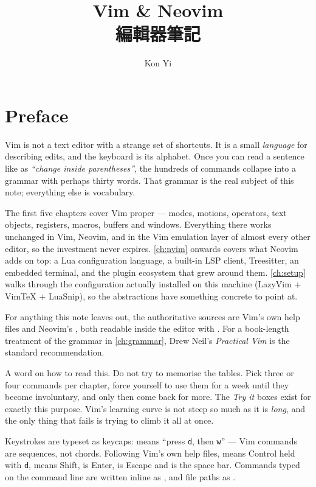 \documentclass[a4paper,oneside]{scrbook}
\author{Kon Yi}
\title{Vim \& Neovim \\ 編輯器筆記}
\begin{document}
\maketitle

\chapter*{Preface}

Vim is not a text editor with a strange set of shortcuts. It is a small
\emph{language} for describing edits, and the keyboard is its alphabet.
Once you can read a sentence like   \key{(} as \emph{``change
	inside parentheses''}, the hundreds of commands collapse into a grammar with
perhaps thirty words. That grammar is the real subject of this note; everything
else is vocabulary.

The first five chapters cover Vim proper --- modes, motions, operators, text
objects, registers, macros, buffers and windows. Everything there works
unchanged in Vim, Neovim, and in the Vim emulation layer of almost every other
editor, so the investment never expires. \autoref{ch:nvim} onwards covers what
Neovim adds on top: a Lua configuration language, a built-in LSP client,
Treesitter, an embedded terminal, and the plugin ecosystem that grew around
them. \autoref{ch:setup} walks through the configuration actually installed on
this machine (LazyVim + VimTeX + LuaSnip), so the abstractions have something
concrete to point at.

For anything this note leaves out, the authoritative sources are Vim's own
help files \cite{vimdoc} and Neovim's \cite{nvimdoc}, both readable inside the
editor with . For a book-length treatment of the grammar in
\autoref{ch:grammar}, Drew Neil's \emph{Practical Vim} \cite{neil2015practicalvim}
is the standard recommendation.

A word on how to read this. Do not try to memorise the tables. Pick three or
four commands per chapter, force yourself to use them for a week until they
become involuntary, and only then come back for more. The \emph{Try it} boxes
exist for exactly this purpose. Vim's learning curve is not steep so much as it
is \emph{long}, and the only thing that fails is trying to climb it all at once.

\begin{notation}
	Keystrokes are typeset as keycaps:   means ``press \texttt{d},
	then \texttt{w}'' --- Vim commands are sequences, not chords. Following Vim's
	own help files,  means Control held with \texttt{d},
	 means Shift,  is Enter,  is Escape and
	 is the space bar. Commands typed on the \key{:} command line
	are written inline as , and file paths as
	.
\end{notation}
\end{document}
